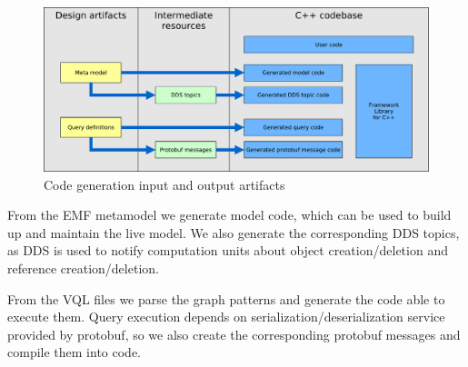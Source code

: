 \begin{figure}[H]
	\begin{center}
		\includegraphics[width=\textwidth]{figures/workflow.pdf}
		\caption{Code generation input and output artifacts}
		\label{fig:workflow}
	\end{center}
\end{figure}

From the EMF metamodel we generate model code, which can be used to build up and maintain the live model. 
We also generate the corresponding DDS topics, as DDS is used to notify computation units about object creation/deletion and reference creation/deletion.

From the VQL files we parse the graph patterns and generate the code able to execute them.
Query execution depends on serialization/deserialization service provided by protobuf, so we also create the corresponding protobuf messages and compile them into \cpp{} code.
